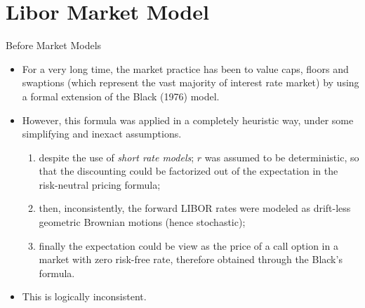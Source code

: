 \documentclass{beamer}
\begin{document}
\section{Libor Market Model}
\begin{frame}{Before Market Models}
	\begin{itemize}
		\item For a very long time, the market practice has been to value caps, floors and swaptions (which represent the vast majority of interest rate market) by using a formal extension of the Black (1976) model. 
		\item However, this formula was applied in a completely heuristic way, under some simplifying and inexact assumptions.
		\begin{enumerate}
			\item despite the use of \emph{short rate models}; $r$ was assumed to be deterministic, so that the discounting could be factorized out of the expectation in the risk-neutral pricing formula; 
			\item then, inconsistently, the forward LIBOR rates were modeled as drift-less geometric Brownian motions (hence stochastic);
			\item finally the expectation could be view as the price of a call option in a market with zero risk-free rate, therefore obtained through the Black’s formula.
		\end{enumerate} 
		\item This is logically inconsistent.
	\end{itemize}
\end{frame}
\end{document}
